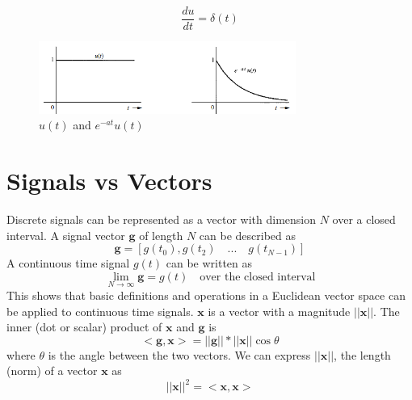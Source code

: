 \documentclass{article}
\begin{document}
    \begin{equation}
        \frac{du}{dt} = \delta(t)
    \end{equation}

    \begin{figure}[h]
        \centering
        \includegraphics[width=0.75\textwidth]{step}
        \caption{$u(t)$ and $e^{-at}u(t)$}
    \end{figure}

    \section{Signals vs Vectors}
    Discrete signals can be represented as a vector with dimension $N$ over a closed interval. A signal vector $\textbf{g}$ of length $N$ can be described as
    \begin{equation}
        \textbf{g} = \left[g(t_0), g(t_2) \quad \textrm{...} \quad g(t_{N-1}) \right]
    \end{equation}
    A continuous time signal $g(t)$ can be written as
    \begin{equation}
        \lim_{N \rightarrow \infty} \textbf{g} = g(t) \quad \textrm{over the closed interval}
    \end{equation}
    This shows that basic definitions and operations in a Euclidean vector space can be applied to continuous time signals. $\textbf{x}$ is a vector with a
    magnitude $||\textbf{x}||$. The inner (dot or scalar) product of $\textbf{x}$ and $\textbf{g}$ is
    \begin{equation}
        <\textbf{g}, \textbf{x}> = ||\textbf{g}|| * ||\textbf{x}|| \cos \theta
    \end{equation}
    where $\theta$ is the angle between the two vectors. We can express $||\textbf{x}||$, the length (norm) of a vector $\textbf{x}$ as
    \begin{equation}
        ||\textbf{x}||^2=<\textbf{x}, \textbf{x}>
    \end{equation}
\end{document}
